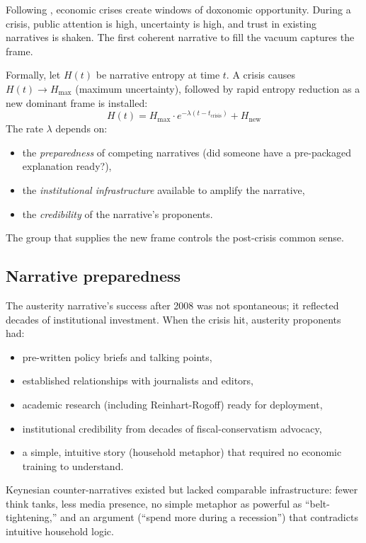 \begin{model}
\label{mod:shock-doctrine}
Following \textcite{klein2007}, economic crises create windows of doxonomic opportunity.
During a crisis, public attention is high, uncertainty is high, and trust in existing narratives is shaken.
The first coherent narrative to fill the vacuum captures the frame.

Formally, let $H(t)$ be narrative entropy at time $t$.
A crisis causes $H(t) \to H_{\text{max}}$ (maximum uncertainty), followed by rapid entropy reduction as a new dominant frame is installed:
\[
  H(t) = H_{\text{max}} \cdot e^{-\lambda(t - t_{\text{crisis}})} + H_{\text{new}}
\]
The rate $\lambda$ depends on:
\begin{itemize}[nosep]
  \item the \emph{preparedness} of competing narratives (did someone have a pre-packaged explanation ready?),
  \item the \emph{institutional infrastructure} available to amplify the narrative,
  \item the \emph{credibility} of the narrative's proponents.
\end{itemize}
The group that supplies the new frame controls the post-crisis common sense.
\end{model}

\subsection{Narrative preparedness}

The austerity narrative's success after 2008 was not spontaneous; it reflected decades of institutional investment.
When the crisis hit, austerity proponents had:
\begin{itemize}[nosep]
  \item pre-written policy briefs and talking points,
  \item established relationships with journalists and editors,
  \item academic research (including Reinhart-Rogoff) ready for deployment,
  \item institutional credibility from decades of fiscal-conservatism advocacy,
  \item a simple, intuitive story (household metaphor) that required no economic training to understand.
\end{itemize}

Keynesian counter-narratives existed but lacked comparable infrastructure: fewer think tanks, less media presence, no simple metaphor as powerful as ``belt-tightening,'' and an argument (``spend more during a recession'') that contradicts intuitive household logic.

